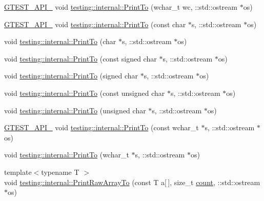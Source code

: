 \begin{DoxyCompactItemize}
\item 
\hyperlink{gtest-port_8h_aa73be6f0ba4a7456180a94904ce17790}{G\+T\+E\+S\+T\+\_\+\+A\+P\+I\+\_\+} void \hyperlink{namespacetesting_1_1internal_a6c50fd437a2ae2ff6f182ccd6c2744dd}{testing\+::internal\+::\+Print\+To} (wchar\+\_\+t wc, \+::std\+::ostream $\ast$os)
\item 
\hyperlink{gtest-port_8h_aa73be6f0ba4a7456180a94904ce17790}{G\+T\+E\+S\+T\+\_\+\+A\+P\+I\+\_\+} void \hyperlink{namespacetesting_1_1internal_ac226053b96d7d61f9407e3b75bab07d9}{testing\+::internal\+::\+Print\+To} (const char $\ast$s, \+::std\+::ostream $\ast$os)
\item 
void \hyperlink{namespacetesting_1_1internal_a553eec7bb50de01c9e91cac4accc606f}{testing\+::internal\+::\+Print\+To} (char $\ast$s, \+::std\+::ostream $\ast$os)
\item 
void \hyperlink{namespacetesting_1_1internal_a792cc5665a34619ed7a6d54711433456}{testing\+::internal\+::\+Print\+To} (const signed char $\ast$s, \+::std\+::ostream $\ast$os)
\item 
void \hyperlink{namespacetesting_1_1internal_a1320096b116f8cc4b688acbd5b783051}{testing\+::internal\+::\+Print\+To} (signed char $\ast$s, \+::std\+::ostream $\ast$os)
\item 
void \hyperlink{namespacetesting_1_1internal_a42c591f2164ad105b502a9262333aed2}{testing\+::internal\+::\+Print\+To} (const unsigned char $\ast$s, \+::std\+::ostream $\ast$os)
\item 
void \hyperlink{namespacetesting_1_1internal_a7fae797c500d66d0f5a9db4f205e3416}{testing\+::internal\+::\+Print\+To} (unsigned char $\ast$s, \+::std\+::ostream $\ast$os)
\item 
\hyperlink{gtest-port_8h_aa73be6f0ba4a7456180a94904ce17790}{G\+T\+E\+S\+T\+\_\+\+A\+P\+I\+\_\+} void \hyperlink{namespacetesting_1_1internal_afb038075e9e2166d1d9158a19e0eed23}{testing\+::internal\+::\+Print\+To} (const wchar\+\_\+t $\ast$s, \+::std\+::ostream $\ast$os)
\item 
void \hyperlink{namespacetesting_1_1internal_a8d41baa371fad3eb5a3dbe1bbc02c290}{testing\+::internal\+::\+Print\+To} (wchar\+\_\+t $\ast$s, \+::std\+::ostream $\ast$os)
\item 
{\footnotesize template$<$typename T $>$ }\\void \hyperlink{namespacetesting_1_1internal_ad3013b6b4c825edee9fe18ff1d982faa}{testing\+::internal\+::\+Print\+Raw\+Array\+To} (const T a\mbox{[}$\,$\mbox{]}, size\+\_\+t \hyperlink{gmock__stress__test_8cc_afd9db40e3361ae09188795e8cbe19752}{count}, \+::std\+::ostream $\ast$os)

\end{DoxyCompactItemize}
